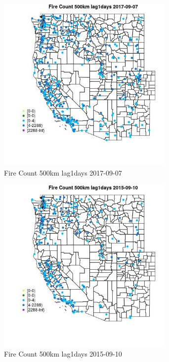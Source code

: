 \begin{figure} 
\centering  
\includegraphics[width=0.77\textwidth]{Code_Outputs/Report_ML_input_PM25_Step4_part_e_de_duplicated_aves_compiled_2019-05-20wNAs_MapObsFire_Count_500km_lag1days2017-09-07.jpg} 
\caption{\label{fig:Report_ML_input_PM25_Step4_part_e_de_duplicated_aves_compiled_2019-05-20wNAsMapObsFire_Count_500km_lag1days2017-09-07}Fire Count 500km lag1days 2017-09-07} 
\end{figure} 
 

\clearpage 

\begin{figure} 
\centering  
\includegraphics[width=0.77\textwidth]{Code_Outputs/Report_ML_input_PM25_Step4_part_e_de_duplicated_aves_compiled_2019-05-20wNAs_MapObsFire_Count_500km_lag1days2015-09-10.jpg} 
\caption{\label{fig:Report_ML_input_PM25_Step4_part_e_de_duplicated_aves_compiled_2019-05-20wNAsMapObsFire_Count_500km_lag1days2015-09-10}Fire Count 500km lag1days 2015-09-10} 
\end{figure} 
 

